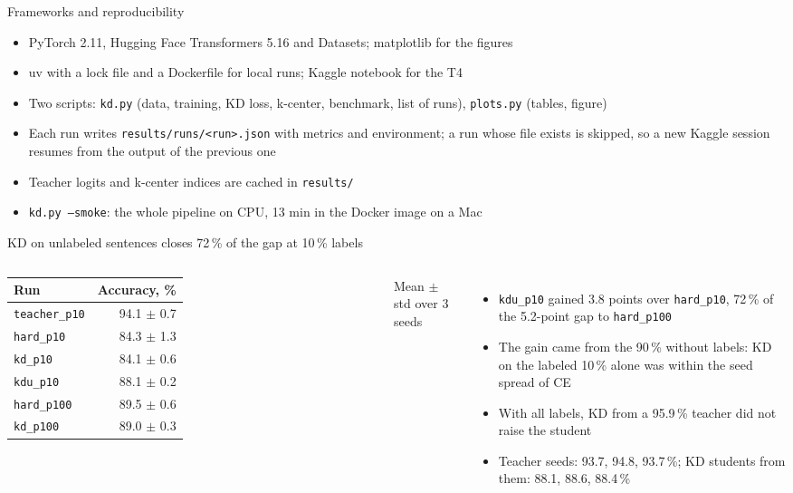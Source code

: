 \documentclass[aspectratio=169,11pt]{beamer}
\begin{document}
\begin{frame}{Frameworks and reproducibility}
  \begin{itemize}
    \item PyTorch 2.11, Hugging Face Transformers 5.16 and Datasets; matplotlib for the figures
    \item uv with a lock file and a Dockerfile for local runs; Kaggle notebook for the T4
    \item Two scripts: \texttt{kd.py} (data, training, KD loss, k-center, benchmark, list of runs), \texttt{plots.py} (tables, figure)
    \item Each run writes \texttt{results/runs/<run>.json} with metrics and environment; a run whose file exists is skipped, so a new Kaggle session resumes from the output of the previous one
    \item Teacher logits and k-center indices are cached in \texttt{results/}
    \item \texttt{kd.py --smoke}: the whole pipeline on CPU, 13 min in the Docker image on a Mac
  \end{itemize}
\end{frame}

\begin{frame}{KD on unlabeled sentences closes 72\,\% of the gap at 10\,\% labels}
  \begin{columns}[T]
    \small
    \begin{tabular}{lr}
      \toprule
      Run & Accuracy, \% \\
      \midrule
      \texttt{teacher\_p10} & 94.1 $\pm$ 0.7 \\
      \texttt{hard\_p10} & 84.3 $\pm$ 1.3 \\
      \texttt{kd\_p10} & 84.1 $\pm$ 0.6 \\
      \texttt{kdu\_p10} & 88.1 $\pm$ 0.2 \\
      \texttt{hard\_p100} & 89.5 $\pm$ 0.6 \\
      \texttt{kd\_p100} & 89.0 $\pm$ 0.3 \\
      \bottomrule
    \end{tabular}

    \footnotesize Mean $\pm$ std over 3 seeds
    \begin{itemize}
      \item \texttt{kdu\_p10} gained 3.8 points over \texttt{hard\_p10}, 72\,\% of the 5.2-point gap to \texttt{hard\_p100}
      \item The gain came from the 90\,\% without labels: KD on the labeled 10\,\% alone was within the seed spread of CE
      \item With all labels, KD from a 95.9\,\% teacher did not raise the student
      \item Teacher seeds: 93.7, 94.8, 93.7\,\%; KD students from them: 88.1, 88.6, 88.4\,\%
    \end{itemize}
  \end{columns}
\end{frame}
\end{document}
